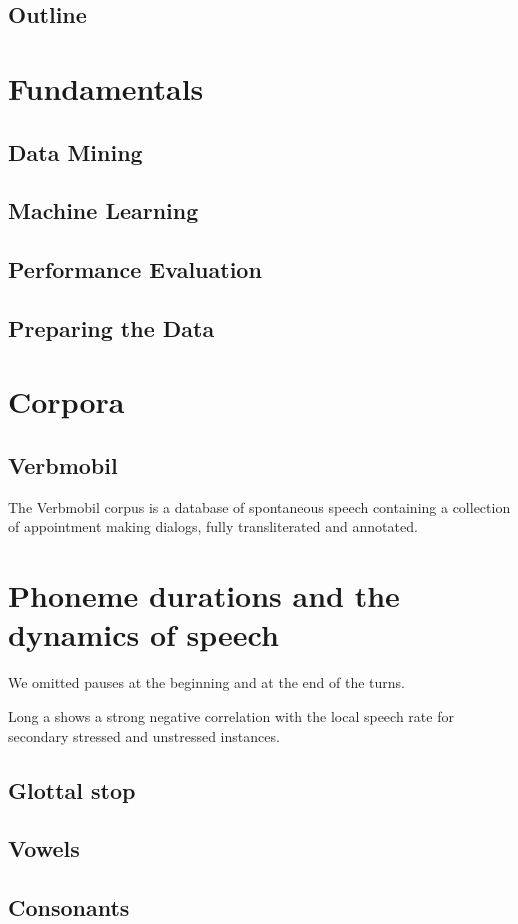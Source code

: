 \documentclass[a4paper]{scrreprt}
\begin{document}
\section{Outline}

\chapter{Fundamentals}
\section{Data Mining}
\section{Machine Learning}
\section{Performance Evaluation}
\section{Preparing the Data}

\chapter{Corpora}
\section{Verbmobil}
The Verbmobil corpus is a database of spontaneous speech containing a collection of appointment making dialogs, fully transliterated and annotated.

\chapter{Phoneme durations and the dynamics of speech}
We omitted pauses at the beginning and at the end of the turns.

Long a shows a strong negative correlation with the local speech rate for secondary stressed and unstressed instances.

\section{Glottal stop}
\section{Vowels}
\section{Consonants}
\end{document}
